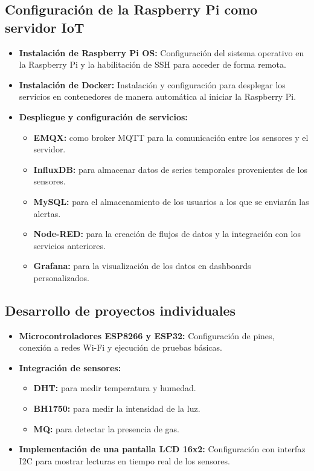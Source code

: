 \subsection*{Configuración de la Raspberry Pi como servidor IoT}

\begin{itemize}
    \item \textbf{Instalación de Raspberry Pi OS:} Configuración del sistema operativo en la Raspberry Pi y la habilitación de SSH para acceder de forma remota.
    \item \textbf{Instalación de Docker:} Instalación y configuración para desplegar los servicios en contenedores de manera automática al iniciar la Raspberry Pi.
    \item \textbf{Despliegue y configuración de servicios:}
    \begin{itemize}
        \item \textbf{EMQX:} como broker MQTT para la comunicación entre los sensores y el servidor.
        \item \textbf{InfluxDB:} para almacenar datos de series temporales provenientes de los sensores.
        \item \textbf{MySQL:} para el almacenamiento de los usuarios a los que se enviarán las alertas.
        \item \textbf{Node-RED:} para la creación de flujos de datos y la integración con los servicios anteriores.
        \item \textbf{Grafana:} para la visualización de los datos en dashboards personalizados.
    \end{itemize}
\end{itemize}

\subsection*{Desarrollo de proyectos individuales}

\begin{itemize}
    \item \textbf{Microcontroladores ESP8266 y ESP32:} Configuración de pines, conexión a redes Wi-Fi y ejecución de pruebas básicas.
    \item \textbf{Integración de sensores:} \begin{itemize}
        \item \textbf{DHT:} para medir temperatura y humedad.
        \item \textbf{BH1750:} para medir la intensidad de la luz.
        \item \textbf{MQ:} para detectar la presencia de gas. 
    \end{itemize}
    \item \textbf{Implementación de una pantalla LCD 16x2:} Configuración con interfaz I2C para mostrar lecturas en tiempo real de los sensores.
\end{itemize}

